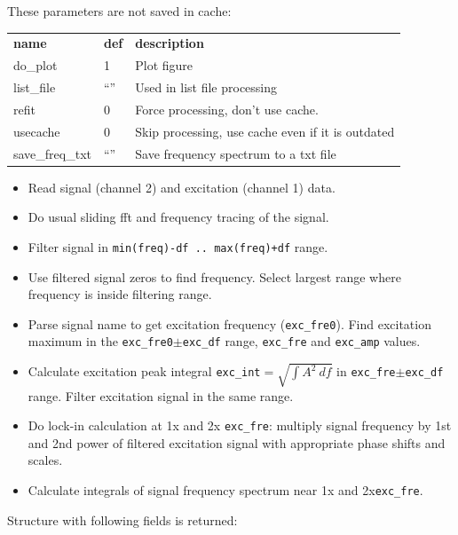 \documentclass[a4paper]{article}
\begin{document}
These parameters are not saved in cache:

\medskip\noindent
\begin{tabular}{p{3cm}p{1cm}p{13cm}}\hline
\bf name & \bf def & \bf description\\
do\_plot   & 1    & Plot figure \\
list\_file & ``'' & Used in list file processing \\
refit      & 0    & Force processing, don't use cache.\\
usecache   & 0    & Skip processing, use cache even if it is outdated\\
save\_freq\_txt & ``'' & Save frequency spectrum to a txt file\\
\hline
\end{tabular}
\medskip

\medskip{}

\begin{itemize}
\item Read signal (channel 2) and excitation (channel 1) data.
\item Do usual sliding fft and frequency tracing of the signal.
\item Filter signal in {\tt min(freq)-df .. max(freq)+df} range.
\item Use filtered signal zeros to find frequency. Select largest
      range where frequency is inside filtering range.
\item Parse signal name to get excitation frequency ({\tt exc\_fre0}).
      Find excitation maximum in the {\tt exc\_fre0}$\pm${\tt exc\_df} range,
      {\tt exc\_fre} and {\tt exc\_amp} values.
\item Calculate excitation peak integral {\tt exc\_int}$=\sqrt{\int A^2\ df}$
      in {\tt exc\_fre}$\pm${\tt exc\_df} range. Filter excitation signal
      in the same range.
\item Do lock-in calculation at 1x and 2x {\tt exc\_fre}: multiply signal
      frequency by 1st and 2nd power of filtered excitation signal with
      appropriate phase shifts and scales.
\item Calculate integrals of signal frequency spectrum near 1x and 2x{\tt exc\_fre}.
\end{itemize}
\medskip

\medskip{}

Structure with following fields is returned:
\end{document}
